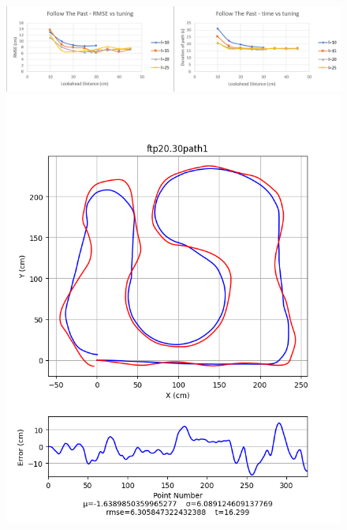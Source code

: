 \documentclass[12pt]{article}
\begin{document}
\begin{flushleft}
\begin{figure}[H]
\includegraphics[width=\linewidth]{images/tuningGraphs/ftp}
\includegraphics[width=\linewidth]{images/pathData/ftppath1}
\endminipage\hfill
{}

\end{figure}
\end{flushleft}
\end{document}
